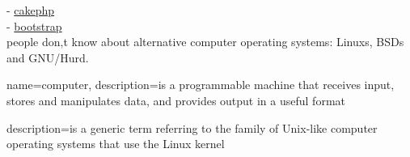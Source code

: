 \documentclass[12pt,a4paper,titlepage]{article}%
\begin{document}
-  \href{http://book.cakephp.org/2.0/fr/index.html}{cakephp} \\
- \href{http://getbootstrap.com/}{bootstrap} \\


people don‚t know about
alternative \gls{computer} operating systems:
\glspl{Linux}, BSDs and GNU/Hurd.



{
name=computer,
description={is a programmable machine that receives input,
stores and manipulates data, and provides
output in a useful format}
}

{
description={is a generic term referring to the family of Unix-like
computer operating systems that use the Linux kernel}
}

\printglossary


\label{lastpage}
\end{document}
